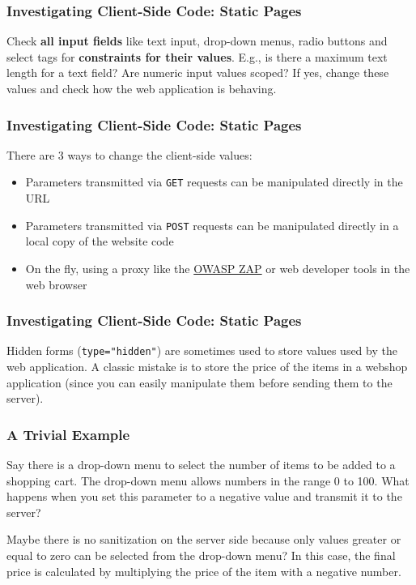 \documentclass[aspectratio=169]{beamer}
\begin{document}
\begin{frame}
    \frametitle{Investigating Client-Side Code: Static Pages}
    Check \textbf{all input fields} like text input, drop-down menus, radio buttons and select tags for \textbf{constraints for their values}. E.g., is there a maximum text length for a text field? Are numeric input values scoped? If yes, change these values and check how the web application is behaving.
\end{frame}

\begin{frame}
    \frametitle{Investigating Client-Side Code: Static Pages}
    There are 3 ways to change the client-side values:
    \begin{itemize}
        \item Parameters transmitted via \texttt{GET} requests can be manipulated directly in the URL
        \item Parameters transmitted via \texttt{POST} requests can be manipulated directly in a local copy of the website code
        \item On the fly, using a proxy like the \href{https://www.zaproxy.org/}{OWASP ZAP} or web developer tools in the web browser
    \end{itemize}
\end{frame}

\begin{frame}
    \frametitle{Investigating Client-Side Code: Static Pages}
    Hidden forms (\texttt{type="hidden"}) are sometimes used to store values used by the web application. A classic mistake is to store the price of the items in a webshop application (since you can easily manipulate them before sending them to the server).
\end{frame}

\begin{frame}
    \frametitle{A Trivial Example}
    Say there is a drop-down menu to select the number of items to be added to a shopping cart. The drop-down menu allows numbers in the range 0 to 100. What happens when you set this parameter to a negative value and transmit it to the server?
    
    Maybe there is no sanitization on the server side because only values greater or equal to zero can be selected from the drop-down menu? In this case, the final price is calculated by multiplying the price of the item with a negative number.
\end{frame}
\end{document}
